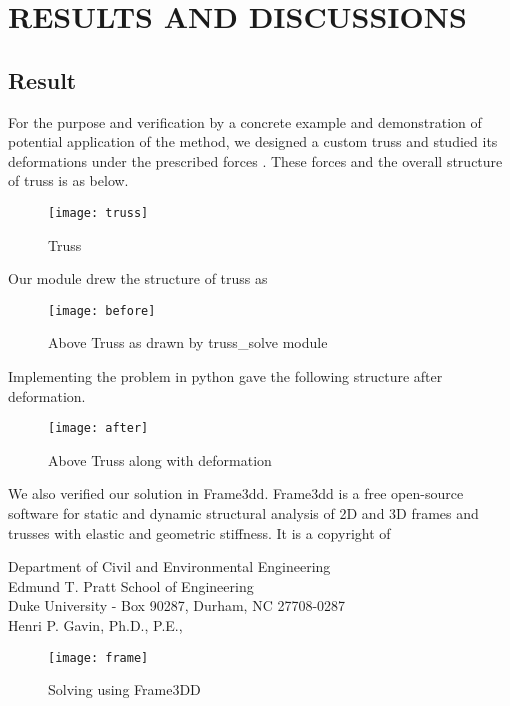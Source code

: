 
\chapter{RESULTS AND DISCUSSIONS}

\section{{\bf{Result}}}

For the purpose and verification by a concrete example and demonstration of potential application of the method, we designed a custom truss and studied its deformations under the prescribed forces . These forces and the overall structure of truss is as below.\\
\noindent

\begin{figure}[h]
	\centering
	\texttt{[image: truss]}
	\caption{Truss}
\end{figure}

\noindent

Our module drew the structure of truss as
\begin{figure}[h!]
	\centering
	\texttt{[image: before]}
	\caption{Above Truss as drawn by truss\_solve module}
\end{figure}

Implementing the problem in python gave the following structure after deformation.\\
\begin{figure}[h!]
	\centering
	\texttt{[image: after]}
	\caption{Above Truss along with deformation}
\end{figure}


\pagebreak
We also verified our solution in Frame3dd. Frame3dd is a free open-source software for static and dynamic structural analysis of 2D and 3D frames and trusses with elastic and geometric stiffness.  It is a copyright of
\begin{center}
     Department of Civil and Environmental Engineering\\
	Edmund T. Pratt School of Engineering\\
	Duke University - Box 90287, Durham, NC 27708-0287\\
	Henri P. Gavin, Ph.D., P.E.,
\end{center}
\begin{figure}[h!]
	\centering
	\texttt{[image: frame]}
	\caption{Solving using Frame3DD}
\end{figure}

